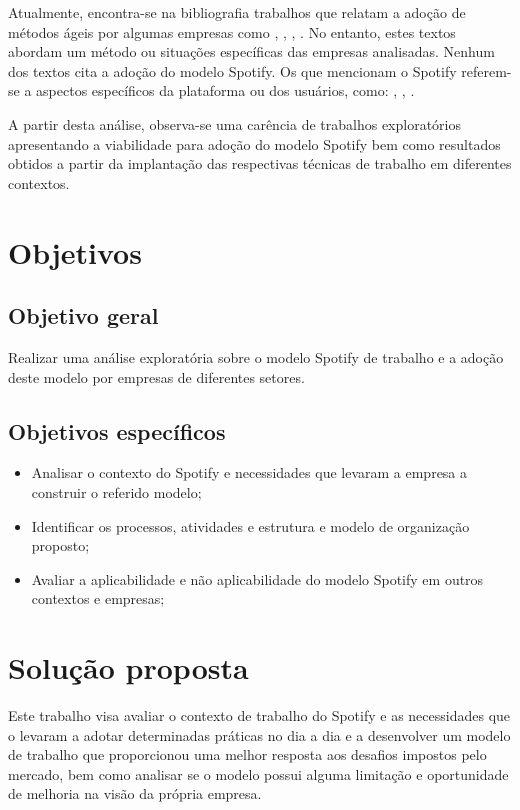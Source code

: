 \documentclass[11pt,a4paper]{article}
\begin{document}
Atualmente, encontra-se na bibliografia trabalhos que relatam a adoção de métodos ágeis por algumas empresas como \cite{EstudoCasoSERPRO}, \cite{MitigacaoDificuldadesSERPRO},  \cite{melo2010adoccao}, \cite{mauricio2016utilizaccao}. No entanto, estes textos abordam um método ou situações específicas das empresas analisadas. Nenhum dos textos cita a adoção do modelo Spotify. Os que mencionam o Spotify referem-se a aspectos específicos da plataforma ou dos usuários, como: \cite{kreitz2010spotify}, \cite{zhang2013understanding}, \cite{goldmann2011measurements}.

A partir desta análise, observa-se uma carência de trabalhos exploratórios apresentando a viabilidade para adoção do modelo Spotify bem como resultados obtidos a partir da implantação das respectivas técnicas de trabalho em diferentes contextos.


\section{Objetivos}\label{sec:objetivos}

\subsection{Objetivo geral}

Realizar uma análise exploratória sobre o modelo Spotify de trabalho e a adoção deste modelo por empresas de diferentes setores.

\subsection{Objetivos específicos}

\begin{itemize}
  \item Analisar o contexto do Spotify e necessidades que levaram a empresa a construir o referido modelo;
  \item Identificar os processos, atividades e estrutura e modelo de organização proposto;
  \item Avaliar a aplicabilidade e não aplicabilidade do modelo Spotify em outros contextos e empresas;
\end{itemize}

\section{Solução proposta	}

Este trabalho visa avaliar o contexto de trabalho do Spotify e as necessidades que o levaram a adotar determinadas práticas no dia a dia e a desenvolver um modelo de trabalho que proporcionou uma melhor resposta aos desafios impostos pelo mercado, bem como analisar se o modelo possui alguma limitação e oportunidade de melhoria na visão da própria empresa.
\end{document}
